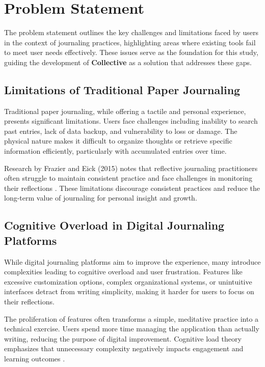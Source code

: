 \section{Problem Statement}\label{sec:problem}

The problem statement outlines the key challenges and limitations faced by users in the context of journaling practices, highlighting areas where existing tools fail to meet user needs effectively. These issues serve as the foundation for this study, guiding the development of \textbf{Collective} as a solution that addresses these gaps.

\subsection{Limitations of Traditional Paper Journaling}\label{subsec:traditional-limits}

Traditional paper journaling, while offering a tactile and personal experience, presents significant limitations. Users face challenges including inability to search past entries, lack of data backup, and vulnerability to loss or damage. The physical nature makes it difficult to organize thoughts or retrieve specific information efficiently, particularly with accumulated entries over time.

Research by Frazier and Eick (2015) notes that reflective journaling practitioners often struggle to maintain consistent practice and face challenges in monitoring their reflections \cite{Frazier2015}. These limitations discourage consistent practices and reduce the long-term value of journaling for personal insight and growth.

\subsection{Cognitive Overload in Digital Journaling Platforms}\label{subsec:cognitive-overload}

While digital journaling platforms aim to improve the experience, many introduce complexities leading to cognitive overload and user frustration. Features like excessive customization options, complex organizational systems, or unintuitive interfaces detract from writing simplicity, making it harder for users to focus on their reflections.

The proliferation of features often transforms a simple, meditative practice into a technical exercise. Users spend more time managing the application than actually writing, reducing the purpose of digital improvement. Cognitive load theory emphasizes that unnecessary complexity negatively impacts engagement and learning outcomes \cite{sweller1988cognitive}.

